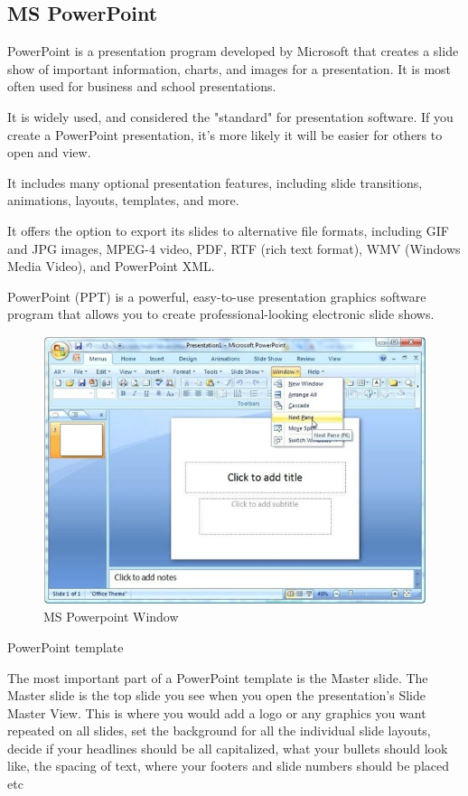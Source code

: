 \documentclass[11pt,a4paper,twoside]{article}
\begin{document}
\subsection{MS PowerPoint}
PowerPoint is a presentation program developed by Microsoft that creates a slide show of important information, charts, and images for a presentation. It is most often used for business and school presentations.\par
It is widely used, and considered the "standard" for presentation software. If you create a PowerPoint presentation, it's more likely it will be easier for others to open and view.\par
It includes many optional presentation features, including slide transitions, animations, layouts, templates, and more.\par
It offers the option to export its slides to alternative file formats, including GIF and JPG images, MPEG-4 video, PDF, RTF (rich text format), WMV (Windows Media Video), and PowerPoint XML.\par
PowerPoint (PPT) is a powerful, easy-to-use presentation graphics software program that allows you to create professional-looking electronic slide shows. 
\begin{figure}[H]
\includegraphics[width=1\textwidth]{Fig 30.jpg}
\caption{MS Powerpoint Window}
\end{figure}
PowerPoint template\par
The most important part of a PowerPoint template is the Master slide. The Master slide is the top slide you see when you open the presentation’s Slide Master View. This is where you would add a logo or any graphics you want repeated on all slides, set the background for all the individual slide layouts, decide if your headlines should be all capitalized, what your bullets should look like, the spacing of text, where your footers and slide numbers should be placed etc\\
\end{document}
